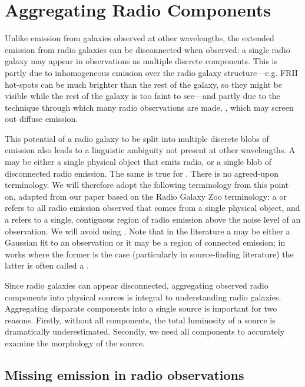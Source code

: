 \section{Aggregating Radio Components}
\label{sec:aggregation}
    
    Unlike emission from galaxies observed at other wavelengths, the extended emission from radio galaxies can be disconnected when observed: a single radio galaxy may appear in observations as multiple discrete components. This is partly due to inhomogeneous emission over the radio galaxy structure---e.g. FRII hot-spots can be much brighter than the rest of the galaxy, so they might be visible while the rest of the galaxy is too faint to see---and partly due to the technique through which many radio observations are made, , which may screen out diffuse emission.

    This potential of a radio galaxy to be split into multiple discrete blobs of emission also leads to a linguistic ambiguity not present at other wavelengths. A  may be either a single physical object that emits radio, or a single blob of disconnected radio emission. The same is true for . There is no agreed-upon terminology. We will therefore adopt the following terminology from this point on, adapted from our paper \citep{alger18radio} based on the Radio Galaxy Zoo terminology: a  or  refers to all radio emission observed that comes from a single physical object, and a  refers to a single, contiguous region of radio emission above the noise level of an observation. We will avoid using . Note that in the literature a  may be either a Gaussian fit to an observation or it may be a region of connected emission; in works where the former is the case (particularly in source-finding literature) the latter is often called a .

    Since radio galaxies can appear disconnected, aggregating observed radio components into physical sources is integral to understanding radio galaxies. Aggregating disparate components into a single source is important for two reasons. Firstly, without all components, the total luminosity of a source is dramatically underestimated. Secondly, we need all components to accurately examine the morphology of the source.
    
    \subsection{Missing emission in radio observations}
    \label{sec:missing-emission}

